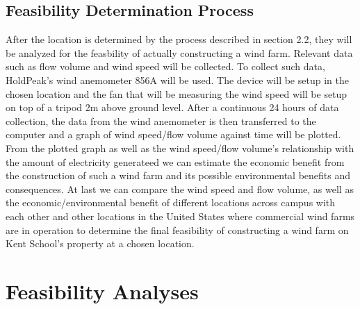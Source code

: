 \documentclass[review]{elsarticle}
\begin{document}
\subsection{Feasibility Determination Process}
After the location is determined by the process described in section 2.2, they will be analyzed for the feasbility of actually constructing a wind farm. Relevant data such as flow volume and wind speed will be collected. To collect such data, HoldPeak's wind anemometer 856A will be used. The device will be setup in the chosen location and the fan that will be measuring the wind speed
 will be setup on top of a tripod 2m above ground level. After a continuous 24 hours of data collection, the data from the wind anemometer is then transferred to the computer and a graph of wind speed/flow volume against time will be plotted.
 \\\indent From the plotted graph as well as the wind speed/flow volume's relationship with the amount of electricity generateed we can estimate the economic benefit from the construction of such a wind farm and its possible environmental benefits and consequences. 
 At last we can compare the wind speed and flow volume, as well as the economic/environmental benefit of different locations across campus with each other and other locations in the United States where commercial wind farms are in operation to determine the final feasibility of constructing a wind farm on Kent School's property at a chosen location.

\section{Feasibility Analyses}

\clearpage
    
\end{document}
